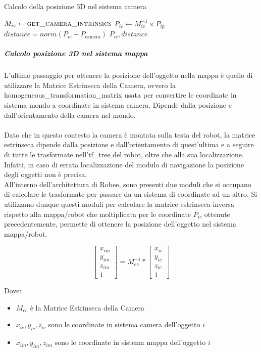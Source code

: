 \begin{algorithm}[h]
	\caption{Calcolo della posizione 3D nel sistema camera}
	\begin{algorithmic}[1]
		\State $M_{ic} \gets \Call{get\_camera\_intrinsics}{}$ 
		\State $P_{ic} \gets M_{ic}^{-1} \times P_{ip}$
		\State $distance = norm(P_{ic} - P_{\text{camera}})$
		\State \Return $P_{ic}, distance$
		\EndProcedure
	\end{algorithmic}
\end{algorithm}

\subparagraph{Calcolo posizione 3D nel sistema mappa}
L'ultimo passaggio per ottenere la posizione dell'oggetto nella mappa è quello di utilizzare la Matrice Estrinseca della Camera, ovvero la \gls{homogeneous_transformation_matrix} usata per convertire le coordinate in sistema mondo a coordinate in sistema camera. Dipende dalla posizione e dall'orientamento della camera nel mondo. \\\\
Dato che in questo contesto la camera è montata sulla testa del robot, la matrice estrinseca dipende dalla posizione e dall'orientamento di quest'ultima e a seguire di tutte le trasformate nell'\gls{tf_tree} del robot, oltre che alla sua localizzazione. Infatti, in caso di errata localizzazione del modulo di navigazione la posizione degli oggetti non è precisa. \\
All'interno dell'architettura di Robee, sono presenti due moduli che si occupano di calcolare le trasformate per passare da un sistema di coordinate ad un altro. Si utilizzano dunque questi moduli per calcolare la matrice estrinseca inversa rispetto alla mappa/robot che moltiplicata per le coordinate $P_{ic}$ ottenute precedentemente, permette di ottenere la posizione dell'oggetto nel sistema mappa/robot.

\[
	\begin{bmatrix}
		x_{im} \\
		y_{im} \\
		z_{im} \\
		1
	\end{bmatrix}
	=
	M_{ec}^{-1}
	*
	\begin{bmatrix}
		x_{ic} \\
		y_{ic} \\
		z_{ic} \\
		1
	\end{bmatrix}
\]

Dove:
\begin{itemize}
	\item $M_{ec}$ è la Matrice Estrinseca della Camera
	\item $x_{ic}, y_{ic}, z_{ic}$ sono le coordinate in sistema camera dell'oggetto $i$
	\item $x_{im}, y_{im}, z_{im}$ sono le coordinate in sistema mappa dell'oggetto $i$
\end{itemize}


